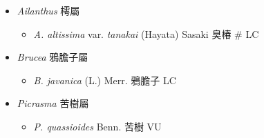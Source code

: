 
  \begin{itemize}
 \item[] \textit{Ailanthus} 樗屬
                                
  \begin{itemize}
        \item[] \textit{A. altissima} var. \textit{tanakai} (Hayata) Sasaki  臭椿  \# LC
  \end{itemize}
 \item[] \textit{Brucea} 鴉膽子屬
                                
  \begin{itemize}
        \item[] \textit{B. javanica} (L.) Merr.  鴉膽子   LC
  \end{itemize}
 \item[] \textit{Picrasma} 苦樹屬
                                
  \begin{itemize}
        \item[] \textit{P. quassioides} Benn.  苦樹   VU
  \end{itemize}
  \end{itemize}
